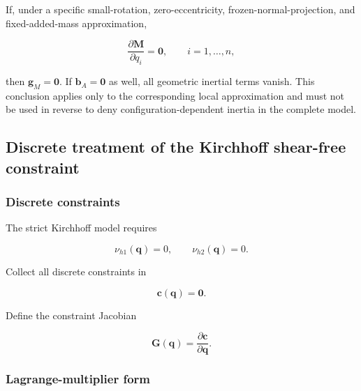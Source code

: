 If, under a specific small-rotation, zero-eccentricity, frozen-normal-projection, and fixed-added-mass approximation,

\begin{equation}
\label{eq:galerkin-2-91}
\frac{\partial\mathbf{M}}{\partial q_{i}} = \mathbf{0},\quad\quad i = 1,\ldots,n,
\end{equation}

then \(\mathbf{g}_{M} = \mathbf{0}\). If \(\mathbf{b}_{A} = \mathbf{0}\) as well, all geometric inertial terms vanish. This conclusion applies only to the corresponding local approximation and must not be used in reverse to deny configuration-dependent inertia in the complete model.

\subsection{Discrete treatment of the Kirchhoff shear-free constraint}\label{sec:galerkin-2-7}

\subsubsection{Discrete constraints}\label{sec:galerkin-2-7-1}

The strict Kirchhoff model requires\cite{MarsdenRatiu1999MechanicsSymmetry,HairerLubichWanner2006GNI}

\begin{equation}
\label{eq:galerkin-2-92}
\nu_{h1}\left( \mathbf{q} \right) = 0,\quad\quad\nu_{h2}\left( \mathbf{q} \right) = 0.
\end{equation}

Collect all discrete constraints in

\begin{equation}
\label{eq:galerkin-2-93}
\mathbf{c}\left( \mathbf{q} \right) = \mathbf{0}.
\end{equation}

Define the constraint Jacobian

\begin{equation}
\label{eq:galerkin-2-94}
\mathbf{G}\left( \mathbf{q} \right) = \frac{\partial\mathbf{c}}{\partial\mathbf{q}}.
\end{equation}

\subsubsection{Lagrange-multiplier form}\label{sec:galerkin-2-7-2}


